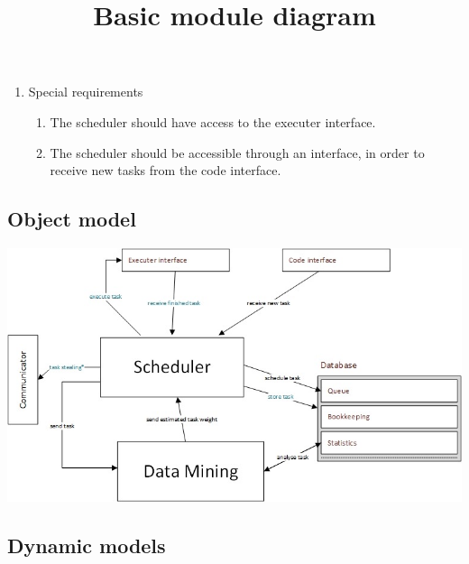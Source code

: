 \begin{enumerate}[1. ]
\item Special requirements

\begin{enumerate}
\item The scheduler should have access to the executer interface.
\item The scheduler should be accessible through an interface, in order to receive new tasks from the code interface.
\end{enumerate}

\end{enumerate}

\subsection{Object model}
\title{Basic module diagram}
\newline
\includegraphics[width=15cm]{images/modules.jpg}
\newpage
\subsection{Dynamic models}

